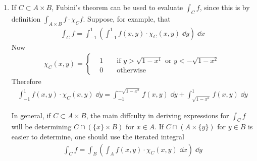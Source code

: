 \begin{enumerate}[label={\upshape(\arabic*)}]
    \item If $C\subset A\times B$, Fubini's theorem can be used to evaluate $\int_Cf$, since 
        this is by definition $\int_{A\times B}f\cdot \chi_Cf$. Suppose, for example, that 
        \begin{align*}
            \int_C f 
            = \int_{-1}^1 \left(\int_{-1}^1 f(x, y)\cdot \chi_C(x,y)\;\dd y\right)\;\dd x
        \end{align*}
        Now 
        \begin{align*}
            \chi_C(x, y)
            = \left\{\begin{aligned}
                & 1 && \text{ if $y>\sqrt{1-x^1}$ or $y<-\sqrt{1-x^2}$} \\
                & 0 && \text{ otherwise}
            \end{aligned}\right.
        \end{align*}
        Therefore 
        \begin{align*}
            \int_{-1}^1 f(x,y)\cdot \chi_C(x,y)\;\dd y
            = \int_{-1}^{-\sqrt{1-x^2}} f(x, y)\;\dd y 
                + \int_{\sqrt{1-x^2}}^{1} f(x, y)\;\dd y
        \end{align*} 

        In general, if $C\subset A\times B$, the main diffculty in deriving expressions for 
        $\int_C f$ will be determining  $C\cap (\{x\}\times B)$ for $x\in A$. If $C\cap (A\times \{y\})$
        for $y\in B$ is easier to determine, one should use the iterated integral
        \begin{align*}
            \int_C f 
            = \int_B\left(\int_A f(x, y)\cdot \chi_C(x, y)\;\dd x \right)\;\dd y
        \end{align*}
\end{enumerate}

